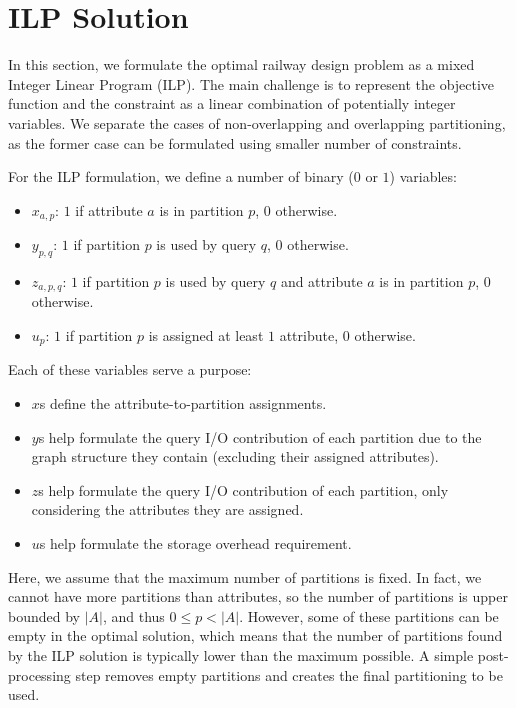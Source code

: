 \section{ILP Solution}\label{sec:ilp}
\noindent
In this section, we formulate the optimal railway design problem as a mixed
Integer Linear Program (ILP). The main challenge is to represent the objective
function and the constraint as a linear combination of potentially integer
variables. We separate the cases of non-overlapping and overlapping
partitioning, as the former case can be formulated using smaller number of 
constraints.

For the ILP formulation, we define a number of binary ($0$ or $1$) variables: 
\begin{itemize}
\item $x_{a,p}$: $1$ if attribute $a$ is in partition $p$, $0$ otherwise.
\item $y_{p,q}$: $1$ if partition $p$ is used by query $q$, $0$ otherwise.
\item $z_{a,p,q}$: $1$ if partition $p$ is used by query $q$ and attribute $a$
is in partition $p$, $0$ otherwise.
\item $u_{p}$: $1$ if partition $p$ is assigned at least $1$ attribute, $0$ otherwise.
\end{itemize}

Each of these variables serve a purpose:
\begin{itemize}
\item $x$s define the attribute-to-partition assignments.
\item $y$s help formulate the query I/O contribution of each partition due to
the graph structure they contain (excluding their assigned attributes).
\item $z$s help formulate the query I/O contribution of each partition, only
considering the attributes they are assigned.
\item $u$s help formulate the storage overhead requirement.
\end{itemize}

Here, we assume that the maximum number of partitions is fixed. In fact, we
cannot have more partitions than attributes, so the number of partitions is
upper bounded by $|A|$, and thus $0\leq p<|A|$. However, some of these
partitions can be empty in the optimal solution, which means that the number
of partitions found by the ILP solution is typically lower than the maximum
possible. A simple post-processing step removes empty partitions and creates
the final partitioning to be used.

